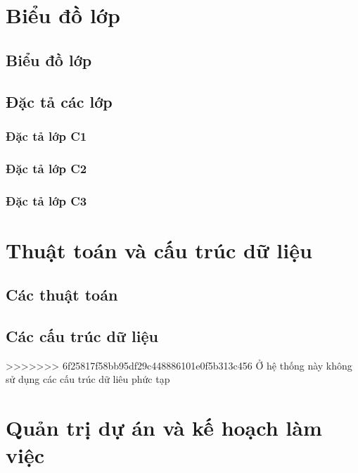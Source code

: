 \documentclass[a4paper, 12pt]{article}
\begin{document}
	\clearpage
	
	\section{Biểu đồ lớp}
	
	\subsection{Biểu đồ lớp}
	
	\subsection{Đặc tả các lớp}
	
	\subsubsection{Đặc tả lớp C1}
	
	\subsubsection{Đặc tả lớp C2}
	
	\subsubsection{Đặc tả lớp C3}
	
	\clearpage
	
	\section{Thuật toán và cấu trúc dữ liệu}
	
	\subsection{Các thuật toán}
	
	\subsection{Các cấu trúc dữ liệu}
>>>>>>> 6f25817f58bb95df29c448886101e0f5b313c456
	Ở hệ thống này không sử dụng các cấu trúc dữ liêu phức tạp
	
	
	\clearpage
	
	\section{Quản trị dự án và kế hoạch làm việc}
	
\end{document}
